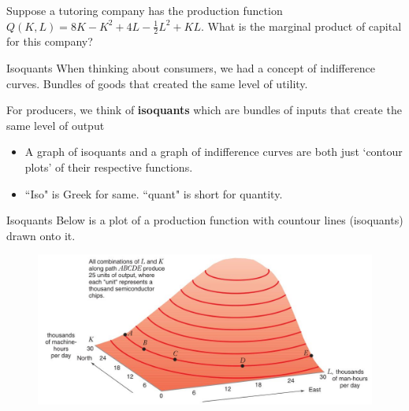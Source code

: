 \documentclass[11pt,t]{beamer}
\begin{document}
\begin{frame}
  
  \bigskip
  Suppose a tutoring company has the production function $Q(K,L) = 8K - K^2 + 4L - \tfrac{1}{2} L^2 + KL$. What is the marginal product of capital for this company?
\end{frame}

\begin{frame}{Isoquants}
  When thinking about consumers, we had a concept of indifference curves. Bundles of goods that created the same level of utility. 
  
  \bigskip\pause
  For producers, we think of \textbf{isoquants} which are bundles of inputs that create the same level of output

  \bigskip\pause
  \begin{itemize}
    \item A graph of isoquants and a graph of indifference curves are both just `contour plots' of their respective functions.

    \item ``Iso" is Greek for same. ``quant" is short for quantity.
  \end{itemize}
\end{frame}

\begin{frame}{Isoquants}
  Below is a plot of a production function with countour lines (isoquants) drawn onto it.

  \begin{figure}
    \includegraphics[width=\linewidth]{figures/fig6_6.jpg}
  \end{figure}
\end{frame}
\end{document}
